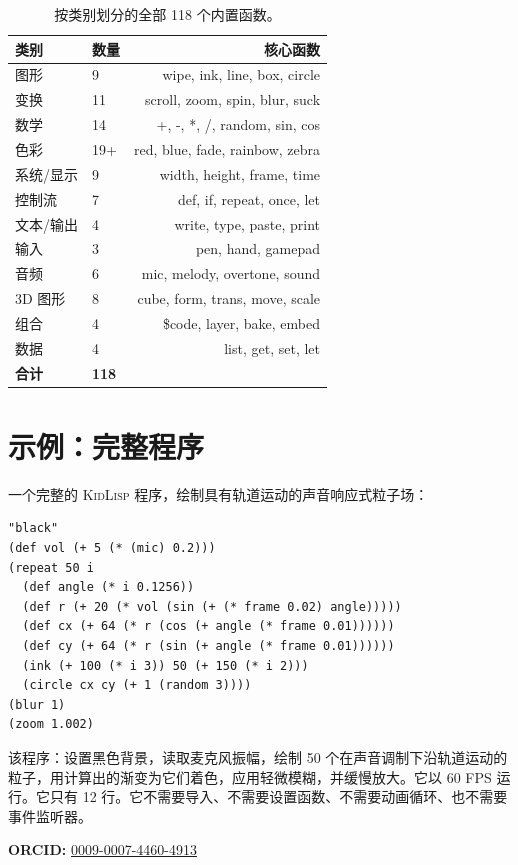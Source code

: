 \documentclass[10pt,letterpaper,twocolumn]{article}
\newcommand{\kl}{\textsc{KidLisp}}
\begin{document}
\begin{table}[h]
\small
\centering
\begin{tabularx}{\columnwidth}{Xlr}
\toprule
\textbf{类别} & \textbf{数量} & \textbf{核心函数} \\
\midrule
图形 & 9 & wipe, ink, line, box, circle \\
变换 & 11 & scroll, zoom, spin, blur, suck \\
数学 & 14 & +, -, *, /, random, sin, cos \\
色彩 & 19+ & red, blue, fade, rainbow, zebra \\
系统/显示 & 9 & width, height, frame, time \\
控制流 & 7 & def, if, repeat, once, let \\
文本/输出 & 4 & write, type, paste, print \\
输入 & 3 & pen, hand, gamepad \\
音频 & 6 & mic, melody, overtone, sound \\
3D 图形 & 8 & cube, form, trans, move, scale \\
组合 & 4 & \$code, layer, bake, embed \\
数据 & 4 & list, get, set, let \\
\midrule
\textbf{合计} & \textbf{118} & \\
\bottomrule
\end{tabularx}
\caption{按类别划分的全部 118 个内置函数。}
\label{tab:builtins}
\end{table}

\section{示例：完整程序}

一个完整的 \kl{} 程序，绘制具有轨道运动的声音响应式粒子场：

\begin{lstlisting}
"black"
(def vol (+ 5 (* (mic) 0.2)))
(repeat 50 i
  (def angle (* i 0.1256))
  (def r (+ 20 (* vol (sin (+ (* frame 0.02) angle)))))
  (def cx (+ 64 (* r (cos (+ angle (* frame 0.01))))))
  (def cy (+ 64 (* r (sin (+ angle (* frame 0.01))))))
  (ink (+ 100 (* i 3)) 50 (+ 150 (* i 2)))
  (circle cx cy (+ 1 (random 3))))
(blur 1)
(zoom 1.002)
\end{lstlisting}

该程序：设置黑色背景，读取麦克风振幅，绘制 50 个在声音调制下沿轨道运动的粒子，用计算出的渐变为它们着色，应用轻微模糊，并缓慢放大。它以 60 FPS 运行。它只有 12 行。它不需要导入、不需要设置函数、不需要动画循环、也不需要事件监听器。

\vspace{0.5em}
\noindent\textbf{ORCID:} \href{https://orcid.org/0009-0007-4460-4913}{0009-0007-4460-4913}



\end{document}
